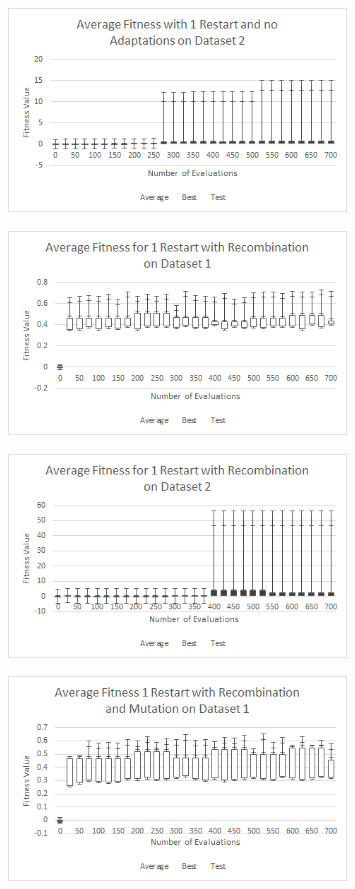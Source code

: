 \documentclass{article}
\begin{document}
\begin{figure}[h]
	\centering
	\includegraphics[width=0.8\textwidth]{res1adaptNoDS2}
\end{figure}
\newpage
\begin{figure}[h]
	\centering
	\includegraphics[width=0.8\textwidth]{res1adaptReDS1}
\end{figure}
\begin{figure}[h]
	\centering
	\includegraphics[width=0.8\textwidth]{res1adaptReDS2}
\end{figure}
\newpage
\begin{figure}[h]
	\centering
	\includegraphics[width=0.8\textwidth]{res1adaptReMuDS1}
\end{figure}
\end{document}
